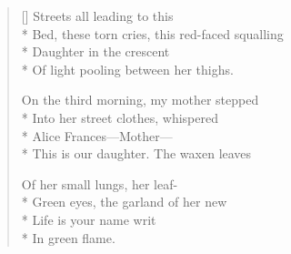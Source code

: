 \begin{verse}[\versewidth]
Streets all leading to this\\*
Bed, these torn cries, this red-faced squalling\\*
Daughter in the crescent\\*
Of light pooling between her thighs.

On the third morning, my mother stepped\\*
Into her street clothes, whispered\\*
Alice Frances---Mother---\\*
This is our daughter.  The waxen leaves

Of her small lungs, her leaf-\\*
Green eyes, the garland of her new\\*
Life is your name writ\\*
In green flame.
\end{verse}
